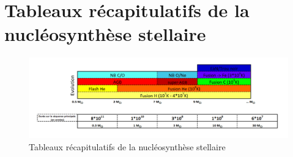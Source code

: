 \section{Tableaux récapitulatifs de la nucléosynthèse stellaire}\label{2.5}

\begin{figure}[H]
	\centering
	\includegraphics[scale=0.37]{images/evo_stel_tab}
	\caption[Tableaux récapitulatifs de la nucléosynthèse stellaire - composé avec Excel 2016 ]{Tableaux récapitulatifs de la nucléosynthèse stellaire}
	\label{Fig. 2.7}
\end{figure}


